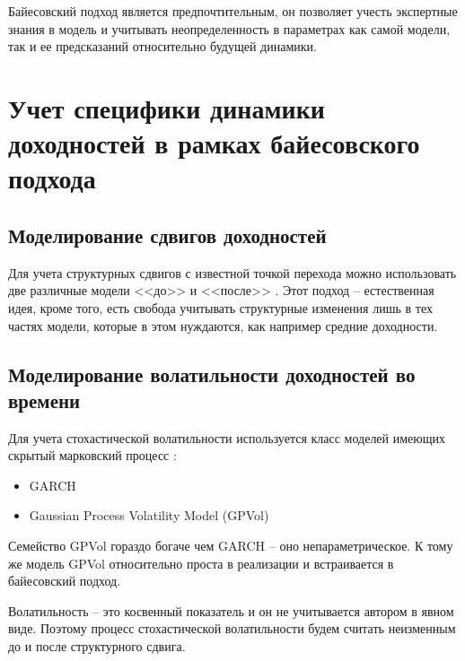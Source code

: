 Байесовский подход является предпочтительным, он позволяет учесть экспертные знания в модель и учитывать неопределенность в параметрах как самой модели, так и ее предсказаний относительно будущей динамики.
\section{Учет специфики динамики доходностей в рамках байесовского подхода}
\subsection{Моделирование сдвигов доходностей}
Для учета структурных сдвигов с известной точкой перехода можно использовать две различные модели <<до>> и <<после>> \citep{salazar1982}. Этот подход -- естественная идея, кроме того, есть свобода учитывать структурные изменения лишь в тех частях модели, которые в этом нуждаются, как например средние доходности.

\subsection{Моделирование волатильности доходностей во времени}
Для учета стохастической волатильности используется класс моделей имеющих скрытый марковский процесс \citep{ghahramani2001}:
\begin{itemize}
	\item GARCH \citep{engle1982}
	\item Gaussian Process Volatility Model (GPVol) \citep{han2016}
\end{itemize}
Семейство GPVol гораздо богаче чем GARCH -- оно непараметрическое. К тому же модель GPVol относительно проста в реализации и встраивается в байесовский подход.

Волатильность -- это косвенный показатель и он не учитывается автором в явном виде. Поэтому процесс стохастической волатильности будем считать неизменным до и после структурного сдвига.

